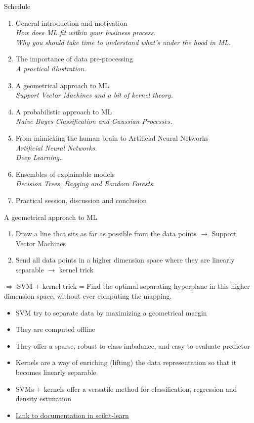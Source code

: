 \documentclass{beamer}
\begin{document}
\begin{frame}{Schedule}
\begin{enumerate}
\item General introduction and motivation \Checkmark \\
{\small \it How does ML fit within your business process.\\
Why you should take time to understand what's under the hood in ML.}
\item The importance of data pre-processing \Checkmark \\
{\small \it A practical illustration.}
\item A geometrical approach to ML\\
{\small \it Support Vector Machines and a bit of kernel theory.}
\item A probabilistic approach to ML\\
{\small \it Naive Bayes Classification and Gaussian Processes.}
\item From mimicking the human brain to Artificial Neural Networks\\
{\small \it Artificial Neural Networks.\\
Deep Learning.}
\item Ensembles of explainable models\\
{\small \it Decision Trees, Bagging and Random Forests.}
\item Practical session, discussion and conclusion
\end{enumerate}
\end{frame}

\begin{frame}{A geometrical approach to ML}
\begin{block}{}
\begin{enumerate}
\item Draw a line that sits as far as possible from the data points $\rightarrow$ Support Vector Machines
\item Send all data points in a higher dimension space where they are linearly separable $\rightarrow$ kernel trick
\end{enumerate}
$\Rightarrow$ SVM + kernel trick = Find the optimal separating hyperplane in this higher dimension space, without ever computing the mapping.
\end{block}

\begin{itemize}
\item SVM try to separate data by maximizing a geometrical margin
\item They are computed offline
\item They offer a sparse, robust to class imbalance, and easy to evaluate predictor
\item Kernels are a way of enriching (lifting) the data representation so that it becomes linearly separable
\item SVMs + kernels offer a versatile method for classification, regression and density estimation
\item \href{http://scikit-learn.org/stable/modules/svm.html}{Link to documentation in scikit-learn}
\end{itemize}

\end{frame}
\end{document}
